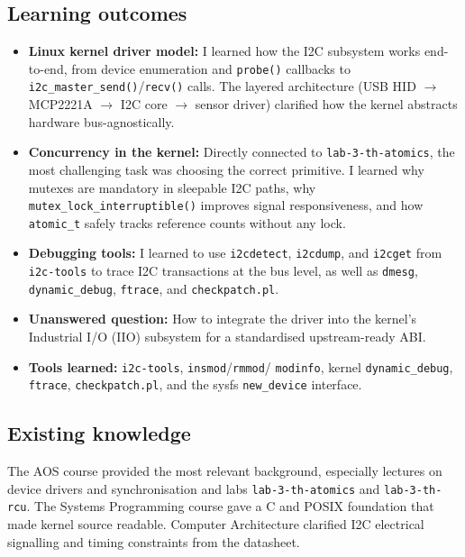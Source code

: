 \documentclass[10pt,a4]{article}
\begin{document}
\subsection{Learning outcomes}

\begin{itemize}
  \item \textbf{Linux kernel driver model:} I learned how the I2C subsystem works
  end-to-end, from device enumeration and \texttt{probe()} callbacks to
  \texttt{i2c\_master\_send()}/\texttt{recv()} calls. The layered architecture
  (USB HID $\to$ MCP2221A $\to$ I2C core $\to$ sensor driver) clarified how the
  kernel abstracts hardware bus-agnostically.

  \item \textbf{Concurrency in the kernel:} Directly connected to
  \texttt{lab-3-th-atomics}, the most challenging task was choosing the correct
  primitive. I learned why mutexes are mandatory in sleepable I2C paths, why
  \texttt{mutex\_lock\_interruptible()} improves signal responsiveness, and how
  \texttt{atomic\_t} safely tracks reference counts without any lock.

  \item \textbf{Debugging tools:} I learned to use \texttt{i2cdetect},
  \texttt{i2cdump}, and \texttt{i2cget} from \texttt{i2c-tools} to trace I2C
  transactions at the bus level, as well as \texttt{dmesg},
  \texttt{dynamic\_debug}, \texttt{ftrace}, and \texttt{checkpatch.pl}.

  \item \textbf{Unanswered question:} How to integrate the driver into the
  kernel's Industrial I/O (IIO) subsystem for a standardised upstream-ready ABI.

  \item \textbf{Tools learned:} \texttt{i2c-tools}, \texttt{insmod}/\texttt{rmmod}/
  \texttt{modinfo}, kernel \texttt{dynamic\_debug}, \texttt{ftrace},
  \texttt{checkpatch.pl}, and the sysfs \texttt{new\_device} interface.
\end{itemize}

\subsection{Existing knowledge}

The AOS course provided the most relevant background, especially lectures on device
drivers and synchronisation and labs \texttt{lab-3-th-atomics} and
\texttt{lab-3-th-rcu}. The Systems Programming course gave a C and POSIX foundation
that made kernel source readable. Computer Architecture clarified I2C electrical
signalling and timing constraints from the datasheet.
\end{document}
